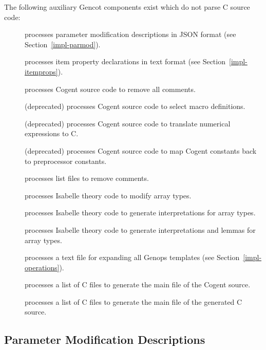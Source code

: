 The following auxiliary Gencot components exist which do not parse C source code:
\begin{description}
\item[] processes parameter modification descriptions in JSON format (see Section~\ref{impl-parmod}).
\item[] processes item property declarations in text format (see Section~\ref{impl-itemprops}).
\item[] processes Cogent source code to remove all comments.
\item[] (deprecated) processes Cogent source code to select macro definitions.
\item[] (deprecated) processes Cogent source code to translate numerical expressions to C.
\item[] (deprecated) processes Cogent source code to map Cogent constants back to preprocessor constants.
\item[] processes list files to remove comments.
\item[] processes Isabelle theory code to modify array types.
\item[] processes Isabelle theory code to generate interpretations for array types.
\item[] processes Isabelle theory code to generate interpretations and lemmas for array types.
\item[] processes a text file for expanding all Genops templates (see Section~\ref{impl-operations}).
\item[] processes a list of C files to generate the main file of the Cogent source.
\item[] processes a list of C files to generate the main file of the generated C source.
\end{description}

\subsection{Parameter Modification Descriptions}
\label{impl-ocomps-parmod}


